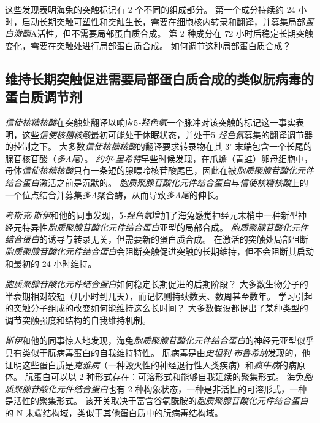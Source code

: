 这些发现表明海兔的突触标记有 2 个不同的组成部分。
第一个成分持续约 24 小时，启动长期突触可塑性和突触生长，需要在细胞核内转录和翻译，并募集局部\textit{蛋白激酶}A活性，但不需要局部蛋白质合成。
第 2 种成分在 72 小时后稳定长期突触变化，需要在突触处进行局部蛋白质合成。
如何调节这种局部蛋白质合成？



\subsection{维持长期突触促进需要局部蛋白质合成的类似朊病毒的蛋白质调节剂}

\textit{信使核糖核酸}在突触处翻译以响应5\textit{-羟色氨}一个脉冲对该突触的标记这一事实表明，这些\textit{信使核糖核酸}最初可能处于休眠状态，并处于5\textit{-羟色氨}募集的翻译调节器的控制之下。
大多数\textit{信使核糖核酸}的翻译要求转录物在其 3' 末端包含一个长尾的腺苷核苷酸（\textit{多A尾}）。
\textit{约尔$\cdot$里希特}早些时候发现，在爪蟾（青蛙）卵母细胞中，母体\textit{信使核糖核酸}只有一条短的腺嘌呤核苷酸尾巴，因此在被\textit{胞质聚腺苷酸化元件结合蛋白}激活之前是沉默的。
\textit{胞质聚腺苷酸化元件结合蛋白}与\textit{信使核糖核酸}上的一个位点结合并募集\textit{多A}聚合酶，从而导致\textit{多A尾}的伸长。


\textit{考斯克$\cdot$斯伊}和他的同事发现，5\textit{-羟色氨}增加了海兔感觉神经元末梢中一种新型神经元特异性\textit{胞质聚腺苷酸化元件结合蛋白}亚型的局部合成。
\textit{胞质聚腺苷酸化元件结合蛋白}的诱导与转录无关，但需要新的蛋白质合成。
在激活的突触处局部阻断\textit{胞质聚腺苷酸化元件结合蛋白}会阻断突触促进突触的长期维持，但不会阻断其启动和最初的 24 小时维持。


\textit{胞质聚腺苷酸化元件结合蛋白}如何稳定长期促进的后期阶段？
大多数生物分子的半衰期相对较短（几小时到几天），而记忆则持续数天、数周甚至数年。
学习引起的突触分子组成的改变如何能维持这么长时间？
大多数假设都提出了某种类型的调节突触强度和结构的自我维持机制。


\textit{斯伊}和他的同事惊人地发现，海兔\textit{胞质聚腺苷酸化元件结合蛋白}的神经元亚型似乎具有类似于朊病毒蛋白的自我维持特性。
朊病毒是由\textit{史坦利$\cdot$布鲁希纳}发现的，他证明这些蛋白质是\textit{克雅病}（一种毁灭性的神经退行性人类疾病）和\textit{疯牛病}的病原体。
朊蛋白可以以 2 种形式存在：可溶形式和能够自我延续的聚集形式。
海兔\textit{胞质聚腺苷酸化元件结合蛋白}也有 2 种构象状态，一种是非活性的可溶形式，一种是活性的聚集形式。
该开关取决于富含谷氨酰胺的\textit{胞质聚腺苷酸化元件结合蛋白}的 N 末端结构域，类似于其他蛋白质中的朊病毒结构域。


